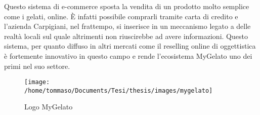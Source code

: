 Questo sistema di e-commerce sposta la vendita di un prodotto molto
semplice come i gelati, online. È infatti possibile comprarli tramite
carta di credito e l'azienda Carpigiani, nel frattempo, si inserisce
in un meccanismo legato a delle realtà locali sul quale altrimenti
non riuscirebbe ad avere informazioni. Questo sistema, per quanto
diffuso in altri mercati come il reselling online di oggettistica
è fortemente innovativo in questo campo e rende l'ecosistema MyGelato
uno dei primi nel suo settore.

\begin{figure}[h!]
\centering{}\texttt{[image: /home/tommaso/Documents/Tesi/thesis/images/mygelato]}
\caption{Logo MyGelato}
\end{figure}

\newpage{}
